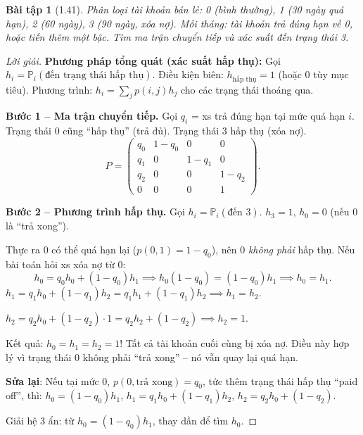 \documentclass[8pt,a4paper]{article}
\newtheorem{exercise}{Bài tập}
\newenvironment{solution}{\begin{proof}[Lời giải]}{\end{proof}}
\newcommand{\prob}{\mathbb{P}}
\begin{document}
\begin{exercise}[1.41]
Phân loại tài khoản bán lẻ: 0 (bình thường), 1 (30 ngày quá hạn), 2 (60 ngày), 3 (90 ngày, xóa nợ). Mỗi tháng: tài khoản trả đúng hạn về 0, hoặc tiến thêm một bậc. Tìm ma trận chuyển tiếp và xác suất đến trạng thái 3.
\end{exercise}
\begin{solution}
\textbf{Phương pháp tổng quát (xác suất hấp thụ):} Gọi $h_i = \prob_i(\text{đến trạng thái hấp thụ})$. Điều kiện biên: $h_{\text{hấp thụ}} = 1$ (hoặc 0 tùy mục tiêu). Phương trình: $h_i = \sum_j p(i,j) h_j$ cho các trạng thái thoáng qua.

\textbf{Bước 1 -- Ma trận chuyển tiếp.}
Gọi $q_i$ = xs trả đúng hạn tại mức quá hạn $i$. Trạng thái 0 cũng ``hấp thụ'' (trả đủ). Trạng thái 3 hấp thụ (xóa nợ).
\[
  P = \begin{pmatrix} q_0 & 1-q_0 & 0 & 0 \\ q_1 & 0 & 1-q_1 & 0 \\ q_2 & 0 & 0 & 1-q_2 \\ 0 & 0 & 0 & 1 \end{pmatrix}.
\]

\textbf{Bước 2 -- Phương trình hấp thụ.} Gọi $h_i = \prob_i(\text{đến 3})$. $h_3 = 1$, $h_0 = 0$ (nếu 0 là ``trả xong'').

Thực ra 0 có thể quá hạn lại ($p(0,1) = 1-q_0$), nên 0 \emph{không phải} hấp thụ. Nếu bài toán hỏi xs xóa nợ từ 0:
\[
  h_0 = q_0 h_0 + (1-q_0)h_1 \implies h_0(1-q_0) = (1-q_0)h_1 \implies h_0 = h_1.
\]
$h_1 = q_1 h_0 + (1-q_1)h_2 = q_1 h_1 + (1-q_1)h_2 \implies h_1 = h_2$.

$h_2 = q_2 h_0 + (1-q_2) \cdot 1 = q_2 h_2 + (1-q_2) \implies h_2 = 1$.

Kết quả: $h_0 = h_1 = h_2 = 1$! Tất cả tài khoản cuối cùng bị xóa nợ. Điều này hợp lý vì trạng thái 0 không phải ``trả xong'' -- nó vẫn quay lại quá hạn.

\textbf{Sửa lại}: Nếu tại mức 0, $p(0, \text{trả xong}) = q_0$, tức thêm trạng thái hấp thụ ``paid off'', thì:
$h_0 = (1-q_0)h_1$, $h_1 = q_1 h_0 + (1-q_1)h_2$, $h_2 = q_2 h_0 + (1-q_2)$.

Giải hệ 3 ẩn: từ $h_0 = (1-q_0)h_1$, thay dần để tìm $h_0$.
\end{solution}
\end{document}
